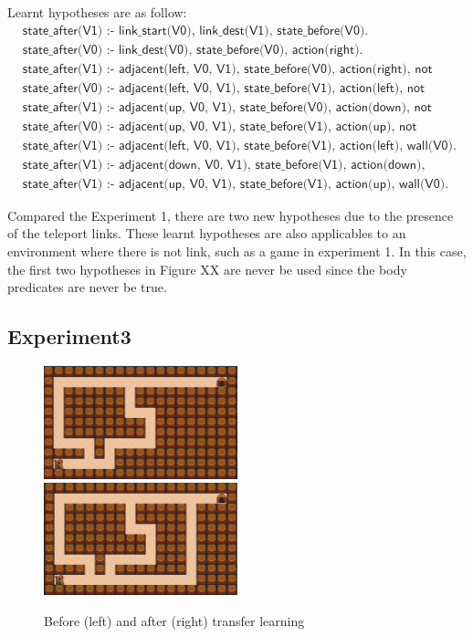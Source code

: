 Learnt hypotheses are as follow:
\begin{equation*}
\begin{split}
&\textsf{state\_after(V1) :- link\_start(V0), link\_dest(V1), state\_before(V0).}\\
&\textsf{state\_after(V0) :- link\_dest(V0), state\_before(V0), action(right).}\\
&\textsf{state\_after(V1) :- adjacent(left, V0, V1), state\_before(V0), action(right), not wall(V1).}\\
&\textsf{state\_after(V0) :- adjacent(left, V0, V1), state\_before(V1), action(left), not wall(V0).}\\
&\textsf{state\_after(V1) :- adjacent(up, V0, V1), state\_before(V0), action(down), not wall(V1).}\\
&\textsf{state\_after(V0) :- adjacent(up, V0, V1), state\_before(V1), action(up), not wall(V0).}\\
&\textsf{state\_after(V1) :- adjacent(left, V0, V1), state\_before(V1), action(left), wall(V0).}\\
&\textsf{state\_after(V1) :- adjacent(down, V0, V1), state\_before(V1), action(down), wall(V0).}\\
&\textsf{state\_after(V1) :- adjacent(up, V0, V1), state\_before(V1), action(up), wall(V0).}
\end{split}
\end{equation*}

Compared the Experiment 1, there are two new hypotheses due to the presence of the teleport links. 
These learnt hypotheses are also applicables to an environment where there is not link, such as a game in experiment 1.
In this case, the first two hypotheses in Figure XX are never be used since the body predicates are never be true. 

\newpage

\subsection{Experiment3}

\begin{figure}[!htb]
\centerline{
\includegraphics[width=0.5\textwidth]{./figures/experiment4_before}
\includegraphics[width=0.5\textwidth]{./figures/experiment4_after}
}
\caption{Before (left) and after (right) transfer learning}
\label{experiment4}
\end{figure}

